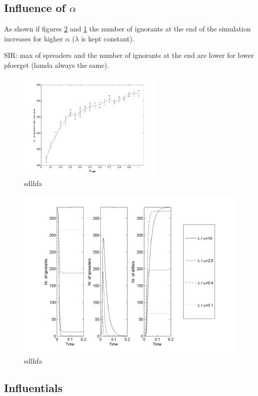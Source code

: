 \subsection{Influence of $\alpha$}
As shown if figures \ref{SIR_ODE} and \ref{Analysis_pforget} the number of ignorants at the end of the simulation increases for higher $\alpha$ ($\lambda$ is kept constant).

SIR: max of spreaders and the number of ignorants at the end are lower for lower pfoerget (lamda always the same).

\begin{figure}[H!]
\includegraphics[width=7cm]{Analysis_pforget}
\caption{sdlhfa}
\label{Analysis_pforget}
\end{figure}

\begin{figure}[H!]
\includegraphics[width=14cm]{SIR_ODE}
\caption{sdlhfa}
\label{SIR_ODE}
\end{figure}
\clearpage
\subsection{Influentials}


